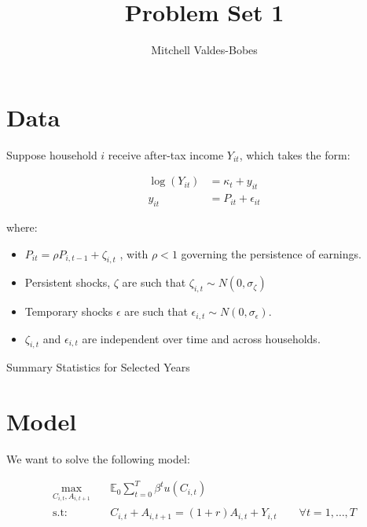\documentclass[12pt]{article}
\begin{document}
\title{Problem Set 1 }
\author{Mitchell Valdes-Bobes}
\maketitle



\section{Data}
Suppose household $i$ receive after-tax income $Y_{i t}$, which takes the form:

\begin{align*}
    \log \left(Y_{i t}\right) &=\kappa_{t}+y_{i t} \\
    y_{i t} &=P_{i t}+\epsilon_{i t}
\end{align*}

where:
\begin{itemize}
    \item $P_{i t}=\rho P_{i, t-1}+\zeta_{i, t}$ , with $\rho<1$ governing the persistence of earnings. 
    \item Persistent shocks, $\zeta$ are such that $\zeta_{i, t} \sim N\left(0, \sigma_{\zeta}\right)$
    \item Temporary shocks $\epsilon$ are such that  $\epsilon_{i, t} \sim N\left(0, \sigma_{\epsilon}\right)$. 
    \item $\zeta_{i, t}$ and $\epsilon_{i, t}$ are independent over time and across households.
\end{itemize}

\begin{table}[h!]\caption{Summary Statistics for Selected Years}

\end{table}

\section{Model}
We want to solve the following model:

\begin{align*}\label{810_ps1:seq_problem}
\max_{C_{i,t}, A_{i,t+1}} \quad &\mathbb{E}_0 \sum_{t = 0}^{T}\beta^{t}u(C_{i,t})\\
\text{s.t:} \quad & C_{i,t} + A_{i,t+1} = (1+r)A_{i,t}+Y_{i,t} \qquad \forall t=1,\ldots,T
\end{align*}
\end{document}
